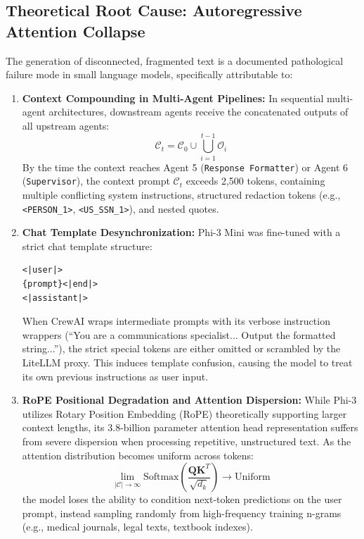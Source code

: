 \documentclass[10pt,a4paper]{article}
\begin{document}
\subsection{Theoretical Root Cause: Autoregressive Attention Collapse}
The generation of disconnected, fragmented text is a documented pathological failure mode in small language models, specifically attributable to:

\begin{enumerate}
    \item \textbf{Context Compounding in Multi-Agent Pipelines:}
    In sequential multi-agent architectures, downstream agents receive the concatenated outputs of all upstream agents:
    \begin{equation}
        \mathcal{C}_{t} = \mathcal{C}_{0} \cup \bigcup_{i=1}^{t-1} \mathcal{O}_i
    \end{equation}
    By the time the context reaches Agent 5 (\texttt{Response Formatter}) or Agent 6 (\texttt{Supervisor}), the context prompt $\mathcal{C}_t$ exceeds 2,500 tokens, containing multiple conflicting system instructions, structured redaction tokens (e.g., \texttt{<PERSON\_1>}, \texttt{<US\_SSN\_1>}), and nested quotes.

    \item \textbf{Chat Template Desynchronization:}
    Phi-3 Mini was fine-tuned with a strict chat template structure:
    \begin{lstlisting}[language=text]
<|user|>
{prompt}<|end|>
<|assistant|>
    \end{lstlisting}
    When CrewAI wraps intermediate prompts with its verbose instruction wrappers (``You are a communications specialist... Output the formatted string...''), the strict special tokens are either omitted or scrambled by the LiteLLM proxy. This induces template confusion, causing the model to treat its own previous instructions as user input.

    \item \textbf{RoPE Positional Degradation and Attention Dispersion:}
    While Phi-3 utilizes Rotary Position Embedding (RoPE) theoretically supporting larger context lengths, its 3.8-billion parameter attention head representation suffers from severe dispersion when processing repetitive, unstructured text. As the attention distribution becomes uniform across tokens:
    \begin{equation}
        \lim_{|\mathcal{C}| \to \infty} \text{Softmax}\left(\frac{\mathbf{Q}\mathbf{K}^T}{\sqrt{d_k}}\right) \to \text{Uniform}
    \end{equation}
    the model loses the ability to condition next-token predictions on the user prompt, instead sampling randomly from high-frequency training n-grams (e.g., medical journals, legal texts, textbook indexes).


\end{enumerate}
\end{document}
